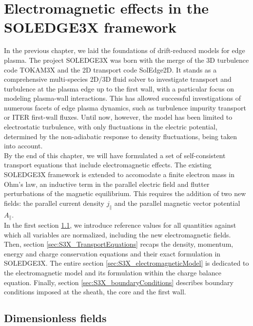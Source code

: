 \chapter{Electromagnetic effects in the SOLEDGE3X framework}
\label{chap:SOLEDGE3X_framework}

In the previous chapter, we laid the foundations of drift-reduced models for edge plasma. The project SOLEDGE3X was born with the merge of the 3D turbulence code TOKAM3X\cite{tamain2016tokam3x} and the 2D transport code SolEdge2D\cite{Bufferand_2015}. It stands as a comprehensive multi-species 2D/3D fluid solver to investigate transport and turbulence at the plasma edge up to the first wall, with a particular focus on modeling plasma-wall interactions. This has allowed successful investigations of numerous facets of edge plasma dynamics, such as turbulence\cite{Bufferand_2021} impurity transport\cite{Ciraolo2021} or ITER first-wall fluxes\cite{Rivals2022}. Until now, however, the model has been limited to electrostatic turbulence, with only fluctuations in the electric potential, determined by the non-adiabatic response to density fluctuations, being taken into account. \\

By the end of this chapter, we will have formulated a set of self-consistent transport equations that include electromagnetic effects. The existing SOLEDGE3X framework is extended to accomodate a finite electron mass in Ohm's law, an inductive term in the parallel electric field and flutter perturbations of the magnetic equilibrium. This requires the addition of two new fields: the parallel current density $j_\parallel$ and the parallel magnetic vector potential $A_\parallel$. \\

In the first section \ref{sec:S3X_referenceValues}, we introduce reference values for all quantities against which all variables are normalized, including the new electromagnetic fields. Then, section \ref{sec:S3X_TransportEquations} recaps the density, momentum, energy and charge conservation equations and their exact formulation in SOLEDGE3X. The entire section \ref{sec:S3X_electromagneticModel} is dedicated to the electromagnetic model and its formulation within the charge balance equation. Finally, section \ref{sec:S3X_boundaryConditions} describes boundary conditions imposed at the sheath, the core and the first wall.



\section{Dimensionless fields}
\label{sec:S3X_referenceValues}

